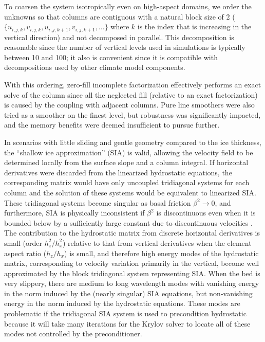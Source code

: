 To coarsen the system isotropically even on high-aspect domains, we order the unknowns so that columns
are contiguous with a natural block size of 2
(\ie $\{u_{i,j,k},v_{i,j,k},u_{i,j,k+1},v_{i,j,k+1},\dotsc\}$ where $k$ is the index that is
increasing in the vertical direction) and not decomposed in parallel.  This decomposition is
reasonable since the number of vertical levels used in simulations is typically between 10 and 100;
it also is convenient since it is compatible with decompositions used by other climate model components.

With this ordering, zero-fill incomplete factorization effectively performs an exact solve of the
column since all the neglected fill (relative to an exact factorization) is caused by the coupling
with adjacent columns.  Pure line smoothers were also tried as a smoother on the finest level, but
robustness was significantly impacted, and the memory benefits were deemed insufficient to pursue
further.

In scenarios with little sliding and gentle geometry compared to the ice thickness, the ``shallow ice approximation'' (SIA) is valid, allowing the velocity field to be determined locally from the surface slope and a column integral.
If horizontal derivatives were discarded from the linearized hydrostatic equations, the corresponding matrix would have only uncoupled tridiagonal systems for each column and the solution of these systems would be equivalent to linearized SIA.
These tridiagonal systems become singular as basal friction $\beta^2 \to 0$, and furthermore, SIA is physically inconsistent if $\beta^2$ is discontinuous even when it is bounded below by a sufficiently large constant due to discontinuous velocities \citep{fowler2001modelling}.
The contribution to the hydrostatic matrix from discrete horizontal derivatives is small (order $h_z^2/h_x^2$) relative to that from vertical derivatives when the element aspect ratio ($h_z/h_x$) is small, and therefore high energy modes of the hydrostatic matrix, corresponding to velocity variation primarily in the vertical, become well approximated by the block tridiagonal system representing SIA.
When the bed is very slippery, there are medium to long wavelength modes with vanishing energy in the norm induced by the (nearly singular) SIA equations, but non-vanishing energy in the norm induced by the hydrostatic equations.
These modes are problematic if the tridiagonal SIA system is used to precondition hydrostatic because it will take many iterations for the Krylov solver to locate all of these modes not controlled by the preconditioner.

